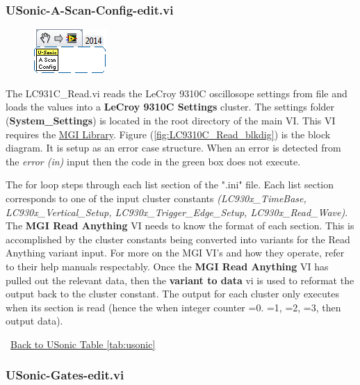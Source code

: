 \documentclass[11pt,a4paper,oldfontcommands]{memoir}
\begin{document}
\subsubsection{USonic-A-Scan-Config-edit.vi} \label{USonic-Config}
\noindent\hrulefill

\begin{figure}[h]
	\includegraphics[scale=0.625]{USonic-A-Scan-Config-edit_main_01}
	\label{fig:USonic-A-Scan-Config-edit_main_01}
\end{figure}

The LC931C\_Read.vi reads the LeCroy 9310C oscillosope settings from file and loads the values into a \textbf{LeCroy 9310C Settings} cluster. The settings folder (\textbf{System\_Settings}) is located in the root directory of the main VI. This VI requires the \href{http://sine.ni.com/nips/cds/view/p/lang/en/nid/209753}{MGI Library}. Figure (\ref{fig:LC9310C_Read_blkdig}) is the block diagram.  It is setup as an error case structure. When an error is detected from the \textit{error (in)} input then the code in the green box does not execute.

The for loop steps through each list section of the ".ini" file. Each list section corresponds to one of the input cluster constants \textit{(LC930x\_TimeBase, LC930x\_Vertical\_Setup, LC930x\_Trigger\_Edge\_Setup, LC930x\_Read\_Wave)}. The \textbf{MGI Read Anything} VI needs to know the format of each section. This is accomplished by the cluster constants being converted into variants for the Read Anything variant input.  For more on the MGI VI's and how they operate, refer to their help manuals respectably. Once the \textbf{MGI Read Anything} VI has pulled out the relevant data, then the \textbf{variant to data} vi is used to reformat the output back to the cluster constant. The output for each cluster only executes when its section is read (hence the when integer counter =0. =1, =2, =3, then output data).

\noindent\hrulefill\, \hyperref[tab:usonic]{Back to USonic Table \ref{tab:usonic}}

\subsubsection{USonic-Gates-edit.vi} \label{USonic-Gates}
\noindent\hrulefill
\end{document}
